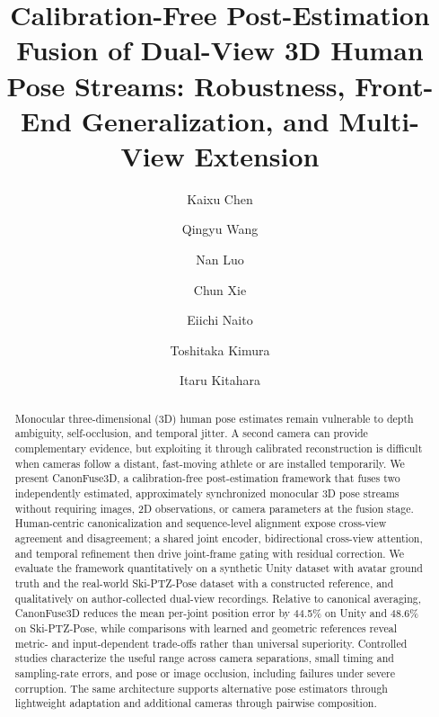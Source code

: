 \documentclass[preprint,12pt]{elsarticle}
\begin{document}
\begin{frontmatter}

\title{Calibration-Free Post-Estimation Fusion of Dual-View 3D Human Pose Streams: Robustness, Front-End Generalization, and Multi-View Extension}

\author[ccs]{Kaixu Chen}
\author[imiss]{Qingyu Wang}
\author[imiss]{Nan Luo}
\author[ccs]{Chun Xie}
\author[nict]{Eiichi Naito}
\author[ntt]{Toshitaka Kimura}
\author[ccs]{Itaru Kitahara}

\address[ccs]{Center for Computational Sciences, University of Tsukuba, Tsukuba, Ibaraki, Japan}
\address[imiss]{Intelligent and Mechanical Interaction Systems, University of Tsukuba, Tsukuba, Ibaraki, Japan}
\address[nict]{Advanced ICT Research Institute, National Institute of Information and Communications Technology, Osaka, Japan}
\address[ntt]{NTT Communication Science Laboratories, Tokyo, Japan}

\begin{abstract}
Monocular three-dimensional (3D) human pose estimates remain vulnerable to depth ambiguity, self-occlusion, and temporal jitter. A second camera can provide complementary evidence, but exploiting it through calibrated reconstruction is difficult when cameras follow a distant, fast-moving athlete or are installed temporarily. We present CanonFuse3D, a calibration-free post-estimation framework that fuses two independently estimated, approximately synchronized monocular 3D pose streams without requiring images, 2D observations, or camera parameters at the fusion stage. Human-centric canonicalization and sequence-level alignment expose cross-view agreement and disagreement; a shared joint encoder, bidirectional cross-view attention, and temporal refinement then drive joint-frame gating with residual correction. We evaluate the framework quantitatively on a synthetic Unity dataset with avatar ground truth and the real-world Ski-PTZ-Pose dataset with a constructed reference, and qualitatively on author-collected dual-view recordings. Relative to canonical averaging, CanonFuse3D reduces the mean per-joint position error by 44.5\% on Unity and 48.6\% on Ski-PTZ-Pose, while comparisons with learned and geometric references reveal metric- and input-dependent trade-offs rather than universal superiority. Controlled studies characterize the useful range across camera separations, small timing and sampling-rate errors, and pose or image occlusion, including failures under severe corruption. The same architecture supports alternative pose estimators through lightweight adaptation and additional cameras through pairwise composition.
\end{abstract}


\end{frontmatter}
\end{document}
